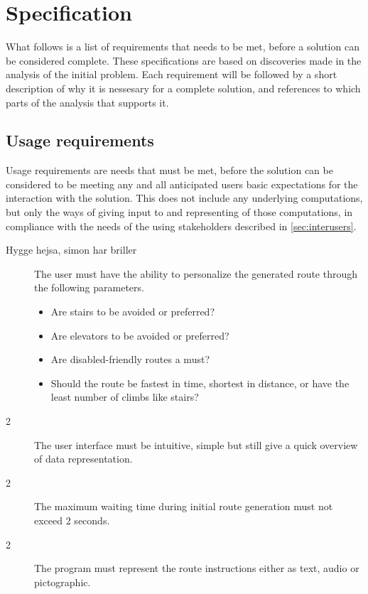 \section{Specification} %
\label{sec:specification}

What follows is a list of requirements that needs to be met, before a solution can be considered complete. These specifications are based on discoveries made in the analysis of the initial problem. Each requirement will be followed by a short description of why it is nessesary for a complete solution, and references to which parts of the analysis that supports it.

\subsection{Usage requirements}

Usage requirements are needs that must be met, before the solution can be considered to be meeting any and all anticipated users basic expectations for the interaction with the solution. This does not include any underlying computations, but only the ways of giving input to and representing of those computations, in compliance with the needs of the using stakeholders described in \cref{sec:interusers}.

\begin{description}
	\item[Hygge hejsa, simon har briller] The user must have the ability to personalize the generated route through the following parameters.

			\begin{itemize}
				\item Are stairs to be avoided or preferred?
				\item Are elevators to be avoided or preferred?
				\item Are disabled-friendly routes a must?
				\item Should the route be fastest in time, shortest in distance, or have the least number of climbs like stairs?
			\end{itemize}

	\item[2] The user interface must be intuitive, simple but still give a quick overview of data representation.
	\item[2] The maximum waiting time during initial route generation must not exceed 2 seconds.
	\item[2] The program must represent the route instructions either as text, audio or pictographic.
\end{description}


